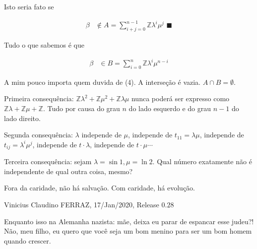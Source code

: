 \documentclass[12pt]{article}
\begin{document}
Isto seria fato se

\begin{align}
\beta &\notin A = \sum_{i + j = 0}^{n-1} \mathbb{Z}\lambda^i \mu^j \,\,\blacksquare
\end{align}

Tudo o que sabemos \'e que

\begin{align}
\beta &\in B = \sum_{i= 0}^n \mathbb{Z} \lambda^i \mu^{n-i}
\end{align}

A mim pouco importa quem duvida de (4). A interse\c{c}\~ao \'e vazia. $A \cap B = \emptyset$.

\vspace{100mm}

Primeira consequ\^encia: $\mathbb{Z}\lambda^2 + \mathbb{Z}\mu^2 + \mathbb{Z}\lambda \mu$ nunca poder\'a ser expresso como $\mathbb{Z}\lambda + \mathbb{Z}\mu + \mathbb{Z}$. Tudo por causa do grau $n$ do lado esquerdo e do grau $n - 1$ do lado direito.

\vspace{3mm}

Segunda consequ\^encia: $\lambda$ independe de $\mu$, independe de $t_{11} = \lambda \mu$, independe de $t_{ij} = \lambda^i \mu^j$, independe de $t\cdot \lambda$, independe de $t\cdot \mu\cdots$

\vspace{3mm}

Terceira consequ\^encia: sejam $\lambda =\sin 1, \mu = \ln 2$. Qual n\'umero exatamente n\~ao \'e independente de qual outra coisa, mesmo?

\vspace{3mm}

Fora da caridade, n\~ao h\'a salva\c{c}\~ao. Com caridade, h\'a evolu\c{c}\~ao.

\vspace{3mm}

Vinicius Claudino FERRAZ, 17/Jan/2020, Release $0.28$

\vspace{3mm}

Enquanto isso na Alemanha nazista: m\~ae, deixa eu parar de espancar esse judeu?! N\~ao, meu filho, eu quero que voc\^e seja um bom menino para ser um bom homem quando crescer.
\end{document}
